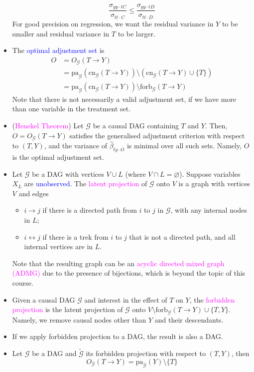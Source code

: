 \documentclass[UTF8]{book}
\newcommand{\et}{&}
\newcommand{\concept}[1]{\textcolor{magenta}{#1}}
\renewcommand{\emph}[1]{\textcolor{blue}{#1}}
\begin{document}
\begin{itemize}
$$
	\dfrac{\sigma_{yy\cdot tC}}{\sigma_{tt\cdot C}}\leq\dfrac{\sigma_{yy\cdot tD}}{\sigma_{tt\cdot D}}
$$
For good precision on regression, we want the residual variance in $Y$ to be smaller and residual variance in $T$ to be larger.
\item The \emph{optimal adjustment set} is 
\begin{align*}
O \et = O_\mathcal{G}(T\rightarrow Y) \\
\et = \mathrm{pa}_\mathcal{G}(\mathrm{cn}_\mathcal{G}(T\rightarrow Y))\setminus (\mathrm{cn}_\mathcal{G}(T\rightarrow Y)\cup \{T\})\\
\et = \mathrm{pa}_\mathcal{G}(\mathrm{cn}_\mathcal{G}(T\rightarrow Y))\setminus \mathrm{forb}_\mathcal{G}(T\rightarrow Y)
\end{align*}
Note that there is not necessarily a valid adjustment set, if we have more than one variable in the treatment set.
\item (\concept{Henekel Theorem}) Let $\mathcal{G}$ be a causal DAG containing $T$ and $Y$. Then, $O = O_\mathcal{G}(T\rightarrow Y)$ satisfies the generalised adjustment criterion with respect to $(T,Y)$, and the variance of $\hat{\beta}_{ty\cdot O}$ is minimal over all such sets. Namely, $O$ is the optimal adjustment set.
\item Let $\mathcal{G}$ be a DAG with vertices $V\cup L$ (where $V\cap L = \varnothing$). Suppose variables $X_L$ are \emph{unobserved}. The \concept{latent projection} of $\mathcal{G}$ onto $V$ is a graph with vertices $V$ and edges
\begin{itemize}
	\item  $i\rightarrow j$ if there is a directed path from $i$ to $j$ in $\mathcal{G}$, with any internal nodes in $L$;
	\item $i\leftrightarrow j$ if there is a trek from $i$ to $j$ that is not a directed path, and all internal vertices are in $L$.
\end{itemize}
Note that the resulting graph can be an \concept{acyclic directed mixed graph (ADMG)} due to the presence of bijections, which is beyond the topic of this course.
\item Given a causal DAG $\mathcal{G}$ and interest in the effect of $T$ on $Y$, the \concept{forbidden projection} is the latent projection of $\mathcal{G}$ onto $V\setminus\mathrm{forb}_\mathcal{G}(T\rightarrow Y)\cup\{T,Y\}$. Namely, we remove causal nodes other than $Y$ and their descendants.
\item If we apply forbidden projection to a DAG, the result is also a DAG.
\item Let $\mathcal{G}$ be a DAG and $\tilde{\mathcal{G}}$ its forbidden projection with respect to $(T,Y)$, then
$$
O_\mathcal{G}(T\rightarrow Y) = \mathrm{pa}_{\tilde{\mathcal{G}}}(Y)\setminus\{T\}
$$
\end{itemize}
\end{document}
